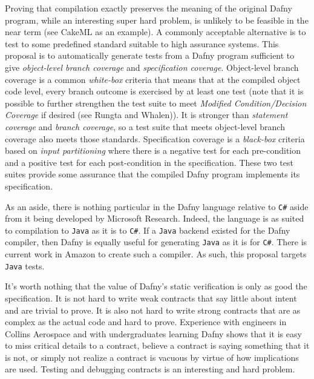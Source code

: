 \documentclass[11pt,onecolumn,notitlepage]{article}
\begin{document}
Proving that compilation exactly preserves the meaning of the original Dafny program, while an interesting super hard problem, is unlikely to be feasible in the near term (see CakeML as an example). A commonly acceptable alternative is to test to some predefined standard suitable to high assurance systems. This proposal is to automatically generate tests from a Dafny program sufficient to give \emph{object-level branch coverage} and \emph{specification coverage}. Object-level branch coverage is a common \emph{white-box} criteria that means that at the compiled object code level, every branch outcome is exercised by at least one test (note that it is possible to further strengthen the test suite to meet \emph{Modified Condition/Decision Coverage} if desired (see Rungta and Whalen)). It is stronger than \emph{statement coverage} and \emph{branch coverage}, so a test suite that meets object-level branch coverage also meets those standards. Specification coverage is a \emph{black-box} criteria based on \emph{input partitioning} where there is a negative test for each pre-condition and a positive test for each post-condition in the specification. These two test suites provide some assurance that the compiled Dafny program implements its specification.

As an aside, there is nothing particular in the Dafny language relative to \texttt{C\#} aside from it being developed by Microsoft Research. Indeed, the language is as suited to compilation to \texttt{Java} as it is to \texttt{C\#}. If a \texttt{Java} backend existed for the Dafny compiler, then Dafny is equally useful for generating \texttt{Java} as it is for \texttt{C\#}. There is current work in Amazon to create such a compiler. As such, this proposal targets \texttt{Java} tests.

It's worth nothing that the value of Dafny's static verification is only as good the specification. It is not hard to write weak contracts that say little about intent and are trivial to prove. It is also not hard to write strong contracts that are as complex as the actual code and hard to prove. Experience with engineers in Collins Aerospace and with undergraduates learning Dafny shows that it is easy to miss critical details to a contract, believe a contract is saying something that it is not, or simply not realize a contract is vacuous by virtue of how implications are used. Testing and debugging contracts is an interesting and hard problem. 
\end{document}
